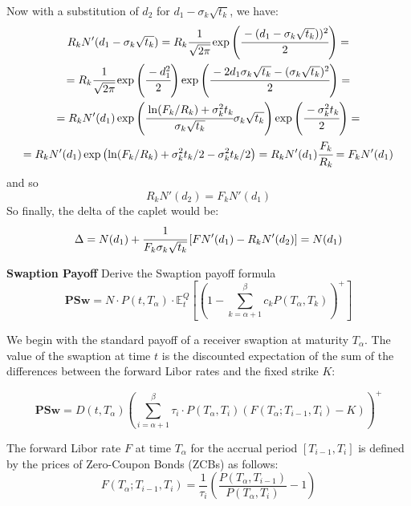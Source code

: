 \documentclass[12pt,a4paper]{exam}
\begin{document}
\begin{questions}
\begin{solution}
	Now with a substitution of $d_2$ for $d_1-\sigma_k\sqrt{t_k}$, we have:
	\begin{equation*}
		\begin{gathered}
			R_kN'(d_1 - \sigma_k\sqrt{t_k}) = R_k\cfrac{1}{\sqrt{2\pi}}\exp\left(\cfrac{-(d_1-\sigma_k\sqrt{t_k}))^2}{2}\right) = \\
			= R_k\cfrac{1}{\sqrt{2\pi}}\exp\left(\cfrac{-d_1^2}{2}\right)\exp\left(\cfrac{-2d_1\sigma_k\sqrt{t_k}-(\sigma_k\sqrt{t_k})^2}{2}\right) = \\  = R_kN'(d_1)\exp\left(\cfrac{\ln(F_k/R_k)+\sigma_k^2t_k}{\sigma_k\sqrt{t_k}}\sigma_k\sqrt{t_k}\right)\exp\left(\cfrac{-\sigma_k^2t_k}{2}\right) = \\
			=R_kN'(d_1)\exp\left(\ln(F_k/R_k)+\sigma^2_kt_k/2-\sigma^2_kt_k/2\right) = R_kN'(d_1)\cfrac{F_k}{R_k} = F_kN'(d_1)
		\end{gathered}
	\end{equation*}
	and so
	\begin{equation*}
		R_kN'(d_2)=F_kN'(d_1)
	\end{equation*}
	So finally, the delta of the caplet would be:
	\begin{equation*}
		\Delta = N(d_1) + \cfrac{1}{F_k\sigma_k\sqrt{t_k}}\left[FN'(d_1)-R_kN'(d_2)\right] =
		N(d_1)
	\end{equation*}
\end{solution}

\question \textbf{Swaption Payoff}
Derive the Swaption payoff formula
\begin{equation*}
	\textbf{PSw} = N\cdot P(t, T_\alpha)\cdot \mathbb{E}^{Q}_t \left[ \left( 1 - \sum_{k=\alpha+1}^\beta c_k P(T_\alpha, T_k) \right)^+ \right]
\end{equation*}

\begin{solution}
We begin with the standard payoff of a receiver swaption at maturity $T_\alpha$. The value of the swaption at time $t$ is the discounted expectation of the sum of the differences between the forward Libor rates and the fixed strike $K$:

\begin{equation*}
	\textbf{PSw} = D(t, T_\alpha) \left( \sum_{i=\alpha+1}^\beta \tau_i \cdot P(T_\alpha, T_i) (F(T_\alpha; T_{i-1}, T_i) - K) \right)^+
\end{equation*}

The forward Libor rate $F$ at time $T_\alpha$ for the accrual period $[T_{i-1}, T_i]$ is defined by the prices of Zero-Coupon Bonds (ZCBs) as follows:
\begin{equation*}
	F(T_\alpha; T_{i-1}, T_i) = \frac{1}{\tau_i} \left( \frac{P(T_\alpha, T_{i-1})}{P(T_\alpha, T_i)} - 1 \right)
\end{equation*}


\end{solution}
\end{questions}
\end{document}
